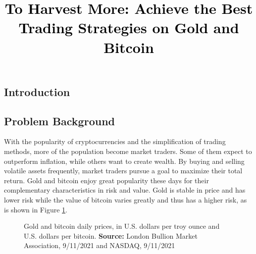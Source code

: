 \documentclass[12pt,a4paper]{article}
\newcommand{\PaperTitle}{To Harvest More: Achieve the Best Trading Strategies on Gold and Bitcoin}  %
\begin{document}
\thispagestyle{empty}


\newpage

\title{
\Large{\textcolor{black}{\PaperTitle}}
}




\maketitle



\tableofcontents
\setcounter{tocdepth}{2}

\newpage
\setcounter{page}{1}


\begin{spacing}{1.2} 



\section{Introduction}
\label{Problem_Statement}

\subsection{Problem Background}
With the popularity of cryptocurrencies and the simplification of trading methods, more of the population become market traders. Some of them expect to outperform inflation, while others want to create wealth. By buying and selling volatile assets frequently, market traders pursue a goal to maximize their total return. Gold and bitcoin enjoy great popularity these days for their complementary characteristics in risk and value. Gold is stable in price and has lower risk while the value of bitcoin varies greatly and thus has a higher risk, as is shown in Figure \ref{figure:prices2in1}.

\begin{figure}[H]
	\caption{Gold and bitcoin daily prices, in U.S. dollars per troy ounce and U.S. dollars per bitcoin. \textbf{Source:} London Bullion Market 
		Association, 9/11/2021 and NASDAQ, 9/11/2021 }
	\label{figure:prices2in1}
\end{figure}


\end{spacing}
\end{document}

